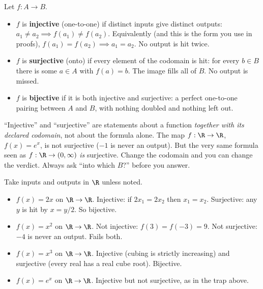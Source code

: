 \begin{formalbox}
Let $f : A \to B$.
\begin{itemize}
  \item $f$ is \textbf{injective} (one-to-one) if distinct inputs give distinct outputs:
        $a_1 \ne a_2 \implies f(a_1) \ne f(a_2)$. Equivalently (and this is the form you
        use in proofs), $f(a_1) = f(a_2) \implies a_1 = a_2$. No output is hit twice.
  \item $f$ is \textbf{surjective} (onto) if every element of the codomain is hit:
        for every $b \in B$ there is some $a \in A$ with $f(a) = b$. The image fills all
        of $B$. No output is missed.
  \item $f$ is \textbf{bijective} if it is both injective and surjective: a perfect
        one-to-one pairing between $A$ and $B$, with nothing doubled and nothing left out.
\end{itemize}
\end{formalbox}

\begin{trapbox}
``Injective'' and ``surjective'' are statements about a function \emph{together with its
declared codomain}, not about the formula alone. The map $f:\R\to\R$, $f(x)=e^x$, is not
surjective ($-1$ is never an output). But the very same formula seen as
$f:\R\to(0,\infty)$ \emph{is} surjective. Change the codomain and you can change the
verdict. Always ask ``into which $B$?'' before you answer.
\end{trapbox}

\begin{example}\label{ch38:smallmaps}
Take inputs and outputs in $\R$ unless noted.
\begin{itemize}
  \item $f(x) = 2x$ on $\R \to \R$. Injective: if $2x_1 = 2x_2$ then $x_1 = x_2$.
        Surjective: any $y$ is hit by $x = y/2$. So bijective.
  \item $f(x) = x^2$ on $\R \to \R$. Not injective: $f(3) = f(-3) = 9$. Not surjective:
        $-4$ is never an output. Fails both.
  \item $f(x) = x^3$ on $\R \to \R$. Injective (cubing is strictly increasing) and
        surjective (every real has a real cube root). Bijective.
  \item $f(x) = e^x$ on $\R \to \R$. Injective but not surjective, as in the trap above.
\end{itemize}
\end{example}

